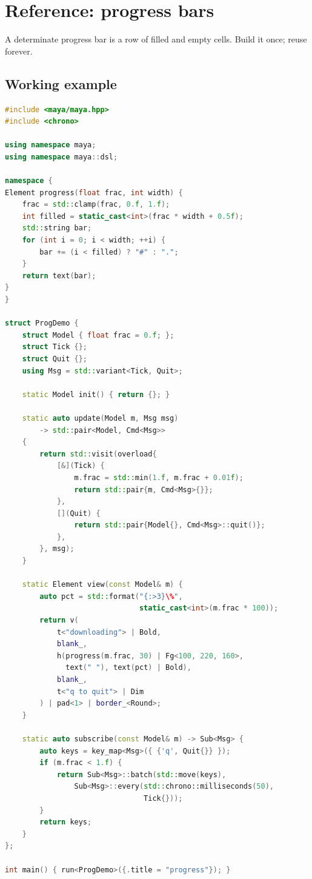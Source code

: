 \chapter{Reference: progress bars}
\label{ch:refman-progress}

\begin{aside}
A determinate progress bar is a row of filled and empty
cells. Build it once; reuse forever.
\end{aside}

\section{Working example}

\begin{lstlisting}[language=C++]
#include <maya/maya.hpp>
#include <chrono>

using namespace maya;
using namespace maya::dsl;

namespace {
Element progress(float frac, int width) {
    frac = std::clamp(frac, 0.f, 1.f);
    int filled = static_cast<int>(frac * width + 0.5f);
    std::string bar;
    for (int i = 0; i < width; ++i) {
        bar += (i < filled) ? "#" : ".";
    }
    return text(bar);
}
}

struct ProgDemo {
    struct Model { float frac = 0.f; };
    struct Tick {};
    struct Quit {};
    using Msg = std::variant<Tick, Quit>;

    static Model init() { return {}; }

    static auto update(Model m, Msg msg)
        -> std::pair<Model, Cmd<Msg>>
    {
        return std::visit(overload{
            [&](Tick) {
                m.frac = std::min(1.f, m.frac + 0.01f);
                return std::pair{m, Cmd<Msg>{}};
            },
            [](Quit) {
                return std::pair{Model{}, Cmd<Msg>::quit()};
            },
        }, msg);
    }

    static Element view(const Model& m) {
        auto pct = std::format("{:>3}\%",
                               static_cast<int>(m.frac * 100));
        return v(
            t<"downloading"> | Bold,
            blank_,
            h(progress(m.frac, 30) | Fg<100, 220, 160>,
              text(" "), text(pct) | Bold),
            blank_,
            t<"q to quit"> | Dim
        ) | pad<1> | border_<Round>;
    }

    static auto subscribe(const Model& m) -> Sub<Msg> {
        auto keys = key_map<Msg>({ {'q', Quit{}} });
        if (m.frac < 1.f) {
            return Sub<Msg>::batch(std::move(keys),
                Sub<Msg>::every(std::chrono::milliseconds(50),
                                Tick{}));
        }
        return keys;
    }
};

int main() { run<ProgDemo>({.title = "progress"}); }
\end{lstlisting}

